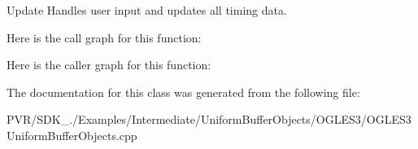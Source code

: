   Update  Handles user input and updates all timing data. 

Here is the call graph for this function\+:




Here is the caller graph for this function\+:




The documentation for this class was generated from the following file\+:\begin{DoxyCompactItemize}
\item 
P\+V\+R/\+S\+D\+K\+\_./\+Examples/\+Intermediate/\+Uniform\+Buffer\+Objects/\+O\+G\+L\+E\+S3/O\+G\+L\+E\+S3\+Uniform\+Buffer\+Objects.\+cpp\end{DoxyCompactItemize}
